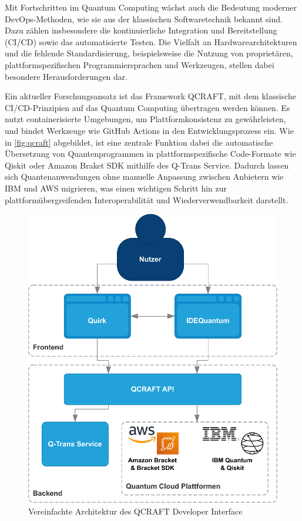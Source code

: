 Mit Fortschritten im Quantum Computing wächst auch die Bedeutung moderner DevOps-Methoden, wie sie aus der klassischen Softwaretechnik bekannt sind. Dazu zählen insbesondere die kontinuierliche Integration und Bereitstellung (CI/CD) sowie das automatisierte Testen. Die Vielfalt an Hardwarearchitekturen und die fehlende Standardisierung, beispielsweise die Nutzung von proprietären, plattformspezifischen Programmiersprachen und Werkzeugen, stellen dabei besondere Herausforderungen dar.

Ein aktueller Forschungsansatz ist das Framework QCRAFT, mit dem klassische CI/CD-Prinzipien auf das Quantum Computing übertragen werden können. Es nutzt containerisierte Umgebungen, um Plattformkonsistenz zu gewährleisten, und bindet Werkzeuge wie GitHub Actions in den Entwicklungsprozess ein. Wie in \autoref{fig:qcraft} abgebildet, ist eine zentrale Funktion dabei die automatische Übersetzung von Quantenprogrammen in plattformspezifische Code-Formate wie Qiskit oder Amazon Braket SDK mithilfe des Q-Trans Service. Dadurch lassen sich Quantenanwendungen ohne manuelle Anpassung zwischen Anbietern wie IBM und AWS migrieren, was einen wichtigen Schritt hin zur plattformübergreifenden Interoperabilität und Wiederverwendbarkeit darstellt.

\begin{figure}[ht!]
  \centering
  \includegraphics[width=1\textwidth]{images/qcraft.pdf}
  \caption{Vereinfachte Architektur des QCRAFT Developer Interface \autocite{romero-alvarez_qcraft_2025}}
  \label{fig:qcraft}
\end{figure}


